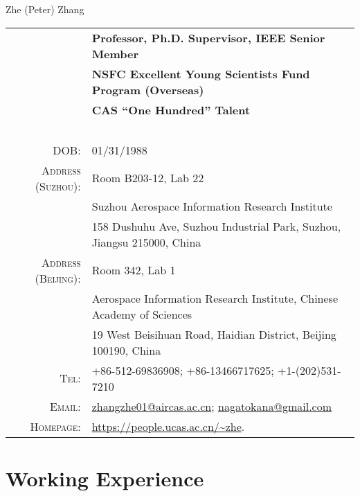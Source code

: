 \documentclass[paper=a4,fontsize=11pt]{scrartcl}
\newcommand{\sepspace}{\vspace*{1em}}		%
\newcommand{\MyName}[1]{
		\Huge \usefont{OT1}{phv}{b}{n} \hfill #1 		%
		\par \normalsize \normalfont}
\newcommand{\MySlogan}[1]{
		\large \usefont{OT1}{phv}{m}{n}\hfill \textit{#1} %
		\par \normalsize \normalfont}
\begin{document}

\MyName{Zhe (Peter) Zhang}

\sepspace


\begin{tabular}{rl}
	& \textbf{Professor, Ph.D. Supervisor, IEEE Senior Member} \\
	& \textbf{NSFC Excellent Young Scientists Fund Program (Overseas)} \\
	& \textbf{CAS ``One Hundred'' Talent} \\
	~&~\\
\textsc{DOB:} & 01/31/1988 \\
\textsc{Address (Suzhou):} &  Room B203-12, Lab 22 \\
& Suzhou Aerospace Information Research Institute \\
& 158 Dushuhu Ave, Suzhou Industrial Park, Suzhou, Jiangsu 215000, China \\
\textsc{Address (Beijing):}	&  Room 342, Lab 1 \\
& Aerospace Information Research Institute, Chinese Academy of Sciences \\
& 19 West Beisihuan Road, Haidian District, Beijing 100190, China \\
\textsc{Tel:} & +86-512-69836908; +86-13466717625; +1-(202)531-7210\\
\textsc{Email:} & \href{mailto:zhangzhe01@aircas.ac.cn}{zhangzhe01@aircas.ac.cn}; \href{mailto:nagatokana@gmail.com}{nagatokana@gmail.com} \\
\textsc{Homepage:} & \href{https://people.ucas.ac.cn/~zhe}{https://people.ucas.ac.cn/{\textasciitilde}zhe}.
\end{tabular}


\section*{Working Experience}
\end{document}
